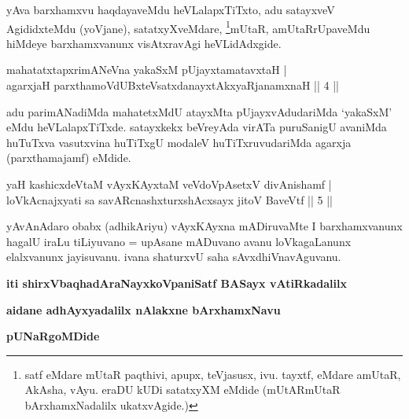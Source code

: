 \begin{artha}
yAva barxhamxvu haqdayaveMdu heVLalapxTiTxto, adu satayxveV AgididxteMdu (yoVjane), satatxyXveMdare, \footnote{satf eMdare mUtaR paqthivi, apupx, teVjasusx, ivu. tayxtf, eMdare amUtaR, AkAsha, vAyu. eraDU kUDi satatxyXM eMdide (mUtARmUtaR bArxhamxNadalilx ukatxvAgide.)}mUtaR, amUtaRrUpaveMdu hiMdeye barxhamxvanunx visAtxravAgi heVLidAdxgide.
\end{artha}

\begin{shl}
mahatatxtapxrimANeVna yakaSxM pUjayxtamatavxtaH | \\
agarxjaH parxthamoVdUBxteVsatxdanayxtAkxyaRjanamxnaH \hfill ||  4 || 
\end{shl}

\begin{artha}
adu parimANadiMda mahatetxMdU atayxMta pUjayxvAdudariMda `yakaSxM' eMdu heVLalapxTiTxde. satayxkekx beVreyAda virATa puruSanigU avaniMda huTuTxva vasutxvina huTiTxgU modaleV huTiTxruvudariMda agarxja (parxthamajamf) eMdide.
\end{artha}


\begin{shl}
yaH kashicxdeVtaM vAyxKAyxtaM veVdoVpAsetxV divAnishamf | \\
loVkAcnajxyati sa savARcnashxturxshAcxsayx jitoV BaveVtf \hfill ||  5 ||
\end{shl}

\begin{artha}
yAvAnAdaro obabx (adhikAriyu) vAyxKAyxna mADiruvaMte I barxhamxvanunx hagalU iraLu tiLiyuvano = upAsane mADuvano avanu loVkagaLanunx elalxvanunx jayisuvanu. ivana shaturxvU saha sAvxdhiVnavAguvanu.
\end{artha}

\begin{center}
{\bf iti shirxVbaqhadAraNayxkoVpaniSatf BASayx vAtiRkadalilx}
\smallskip

{\bf aidane adhAyxyadalilx nAlakxne bArxhamxNavu}

\smallskip
{\bf pUNaRgoMDide}
\end{center}
